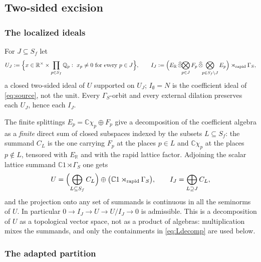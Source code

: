 \documentclass[11pt]{amsart}
\theoremstyle{definition}
\theoremstyle{remark}
\newcommand{\C}{\mathbb C}
\newcommand{\R}{\mathbb R}
\newcommand{\Q}{\mathbb Q}
\begin{document}
\subsection{Two-sided excision}

\subsubsection*{The localized ideals}

For $J\subseteq S_f$ let
\begin{equation}\label{eq:UJ}
U_J:=\Bigl\{x\in\R^{\times}\times\prod_{p\in S_f}\Q_p:\ x_p\ne0\ \text{for every }p\in J\Bigr\},\qquad
I_J:=\Bigl(E_{\R}\,\widehat\otimes\!\!\bigotimes_{p\in J}F_p\,\widehat\otimes\!
\!\bigotimes_{p\in S_f\setminus J}E_p\Bigr)\rtimes_{\mathrm{rapid}}\Gamma_S ,
\end{equation}
a closed two-sided ideal of $U$ supported on $U_J$; $I_{\emptyset}=N$ is the
coefficient ideal of \eqref{eq:source}, not the unit.  Every $\Gamma_S$-orbit
and every external dilation preserves each $U_J$, hence each $I_J$.

The finite splittings $E_p=\C\chi_p\oplus F_p$ give a decomposition of the
coefficient algebra as a \emph{finite} direct sum of closed subspaces indexed
by the subsets $L\subseteq S_f$: the summand $C_L$ is the one carrying $F_p$ at
the places $p\in L$ and $\C\chi_p$ at the places $p\notin L$, tensored with
$E_{\R}$ and with the rapid lattice factor.  Adjoining the scalar lattice
summand $\C1\rtimes\Gamma_S$ one gets
\begin{equation}\label{eq:Ldecomp}
U=\Bigl(\bigoplus_{L\subseteq S_f}C_L\Bigr)\oplus\bigl(\C1
\rtimes_{\mathrm{rapid}}\Gamma_S\bigr),\qquad
I_J=\bigoplus_{L\supseteq J}C_L ,
\end{equation}
and the projection onto any set of summands is continuous in all the seminorms
of $U$.  In particular $0\to I_J\to U\to U/I_J\to0$ is admissible.  This is a
decomposition of $U$ as a topological vector space, not as a product of
algebras: multiplication mixes the summands, and only the containments in
\eqref{eq:Ldecomp} are used below.

\subsubsection*{The adapted partition}
\end{document}
